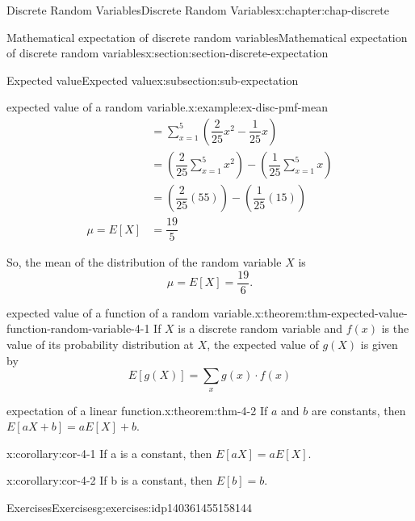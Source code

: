 \documentclass[oneside,10pt,]{book}
\numberwithin{equation}{section}
\newcommand{\amp}{&}
\begin{document}
\begin{chapterptx}{Discrete Random Variables}{}{Discrete Random Variables}{}{}{x:chapter:chap-discrete}
\begin{sectionptx}{Mathematical expectation of discrete random variables}{}{Mathematical expectation of discrete random variables}{}{}{x:section:section-discrete-expectation}
\begin{subsectionptx}{Expected value}{}{Expected value}{}{}{x:subsection:sub-expectation}
\begin{example}{expected value of a random variable.}{x:example:ex-disc-pmf-mean}
\begin{align*}
\amp = \sum\limits_{x=1}^5 \left(\dfrac{2}{25}x^2 - \dfrac{1}{25}x\right)\\
\amp = \left(\dfrac{2}{25}\sum\limits_{x=1}^5 x^2\right) - \left(\dfrac{1}{25}\sum\limits_{x=1}^5 x\right)\\
\amp = \left(\dfrac{2}{25}\left(55\right)\right) - \left(\dfrac{1}{25}\left(15\right)\right)\\
\mu = E[X] \amp = \dfrac{19}{5}
\end{align*}
%
\par
So, the mean of the distribution of the random variable \(X\) is%
\begin{equation*}
\mu = E[X] = \dfrac{19}{6}\text{.}
\end{equation*}
%
\end{example}
\begin{theorem}{expected value of a function of a random variable.}{}{x:theorem:thm-expected-value-function-random-variable-4-1}%
If \(X\) is a discrete random variable and \(\displaystyle f(x)\) is the value of its probability distribution at \(X\), the expected value of \(\displaystyle
g(X)\) is given by%
\begin{equation*}
E[g(X)] = \sum_x g(x)\cdot f(x)
\end{equation*}
%
\end{theorem}
\begin{theorem}{expectation of a linear function.}{}{x:theorem:thm-4-2}%
If \(\displaystyle a\) and \(\displaystyle b\) are constants, then \(\displaystyle E[aX +b] = aE[X]+b\).%
\end{theorem}
\begin{corollary}{}{}{x:corollary:cor-4-1}%
If a is a constant, then \(\displaystyle E[aX] = aE[X]\).%
\end{corollary}
\begin{corollary}{}{}{x:corollary:cor-4-2}%
If b is a constant, then \(\displaystyle E[b] = b\).%
\end{corollary}
\end{subsectionptx}
%
%
\typeout{************************************************}
\typeout{************************************************}
%
\begin{exercises-subsection}{Exercises}{}{Exercises}{}{}{g:exercises:idp140361455158144}
\end{exercises-subsection}
\end{sectionptx}
\end{chapterptx}
\end{document}
